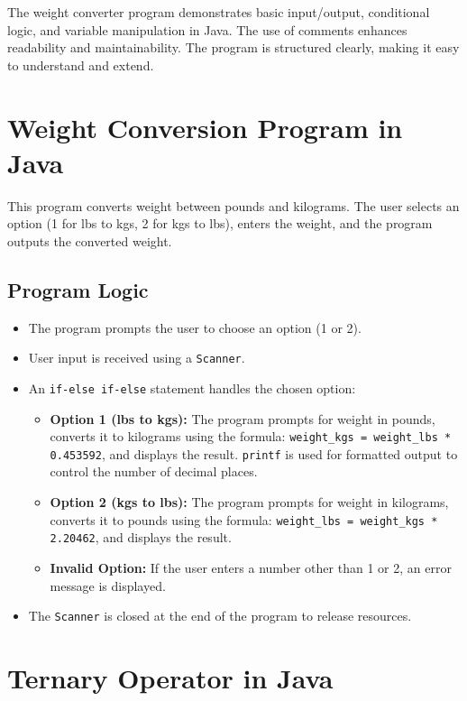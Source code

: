 \documentclass{article}
\begin{document}
The weight converter program demonstrates basic input/output, conditional logic, and variable manipulation in Java. The use of comments enhances readability and maintainability.  The program is structured clearly, making it easy to understand and extend.


\section{Weight Conversion Program in Java}

This program converts weight between pounds and kilograms.  The user selects an option (1 for lbs to kgs, 2 for kgs to lbs), enters the weight, and the program outputs the converted weight.

\subsection{Program Logic}

\begin{itemize}
    \item The program prompts the user to choose an option (1 or 2).
    \item User input is received using a \texttt{Scanner}.
    \item An \texttt{if-else if-else} statement handles the chosen option:
    \begin{itemize}
        \item \textbf{Option 1 (lbs to kgs): } The program prompts for weight in pounds, converts it to kilograms using the formula: \texttt{weight\_kgs = weight\_lbs * 0.453592}, and displays the result.  \texttt{printf} is used for formatted output to control the number of decimal places.
        \item \textbf{Option 2 (kgs to lbs): } The program prompts for weight in kilograms, converts it to pounds using the formula: \texttt{weight\_lbs = weight\_kgs * 2.20462}, and displays the result.
        \item \textbf{Invalid Option:} If the user enters a number other than 1 or 2, an error message is displayed.
    \end{itemize}
    \item The \texttt{Scanner} is closed at the end of the program to release resources.
\end{itemize}


\section{Ternary Operator in Java}
\end{document}
